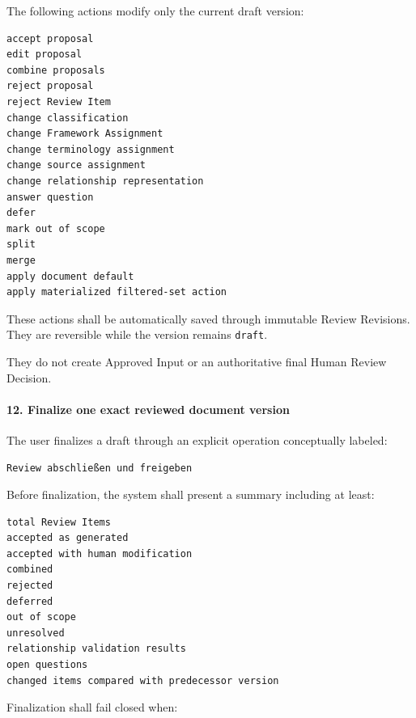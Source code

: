 The following actions modify only the current draft version:

\begin{verbatim}
accept proposal
edit proposal
combine proposals
reject proposal
reject Review Item
change classification
change Framework Assignment
change terminology assignment
change source assignment
change relationship representation
answer question
defer
mark out of scope
split
merge
apply document default
apply materialized filtered-set action
\end{verbatim}

These actions shall be automatically saved through immutable Review Revisions. They are reversible while the version remains \texttt{draft}.

They do not create Approved Input or an authoritative final Human Review Decision.

\hypertarget{12-finalize-one-exact-reviewed-document-version}{%
\paragraph{12. Finalize one exact reviewed document version}\label{12-finalize-one-exact-reviewed-document-version}}

The user finalizes a draft through an explicit operation conceptually labeled:

\begin{verbatim}
Review abschließen und freigeben
\end{verbatim}

Before finalization, the system shall present a summary including at least:

\begin{verbatim}
total Review Items
accepted as generated
accepted with human modification
combined
rejected
deferred
out of scope
unresolved
relationship validation results
open questions
changed items compared with predecessor version
\end{verbatim}

Finalization shall fail closed when:

